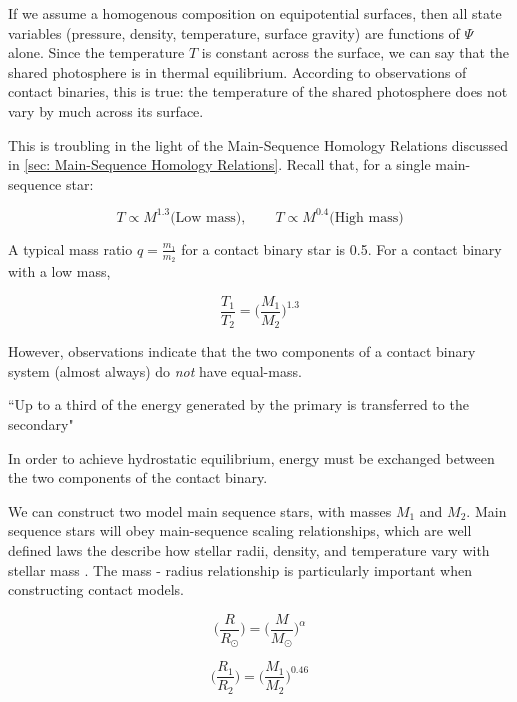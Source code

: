 \documentclass[12pt]{article} %
\numberwithin{equation}{section} %
\begin{document}
If we assume a homogenous composition on equipotential surfaces, then all state variables (pressure, density, temperature, surface gravity) are functions of $\Psi$ alone. Since the temperature $T$ is constant across the surface, we can say that the shared photosphere is in thermal equilibrium. According to observations of contact binaries, this is true: the temperature of the shared photosphere does not vary by much across its surface. 

This is troubling in the light of the Main-Sequence Homology Relations discussed in \ref{sec: Main-Sequence Homology Relations}. Recall that, for a single main-sequence star:

\begin{equation} \label{homology_T_reprint}
T \propto M^{1.3} \text{(Low mass)}, \qquad T \propto M^{0.4} \text{(High mass)} 
\end{equation}

A typical mass ratio $q = \frac{m_{1}}{m_{2}}$ for a contact binary star is 0.5. For a contact binary with a low mass,

\begin{equation}
\frac{T_{1}}{T_{2}} = \Big( \frac{M_{1}}{M_{2}} \Big)^{1.3}
\end{equation}

However, observations indicate that the two components of a contact binary system (almost always) do \emph{not} have equal-mass. 

``Up to a third of the energy generated by the primary is transferred to the secondary"\citep{mochnacki1981contact}

In order to achieve hydrostatic equilibrium, energy must be exchanged between the two components of the contact binary.

We can construct two model main sequence stars, with masses $M_{1}$ and $M_{2}$. Main sequence stars will obey main-sequence scaling relationships, which are well defined laws the describe how stellar radii, density, and temperature vary with stellar mass \citep{kippenhahn1990stellar}. The mass - radius relationship is particularly important when constructing contact models. 

\begin{equation} \label{eqn: mass_radius}
 \bigg( \frac{R}{R_{\odot}} \bigg) = \bigg( \frac{M}{M_{\odot}} \bigg)^{\alpha}
\end{equation}

\begin{equation} \label{eqn: roche_mass_radius}
\bigg( \frac{R_{1}}{R_{2}} \bigg) = \bigg( \frac{M_{1}}{M_{2}} \bigg)^{0.46}
\end{equation}
\end{document}
